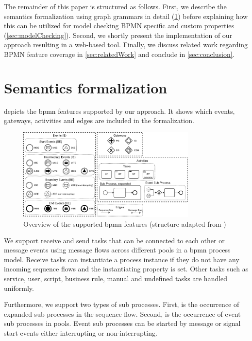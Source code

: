 \documentclass[adraft, copyright, creativecommons]{eptcs} %
\begin{document}
The remainder of this paper is structured as follows.
First, we describe the semantics formalization using graph grammars in detail (\cref{sec:formalization}) before explaining how this can be utilized for model checking BPMN specific and custom properties (\cref{sec:modelChecking}).
Second, we shortly present the implementation of our approach resulting in a web-based tool.
Finally, we discuss related work regarding BPMN feature coverage in \cref{sec:relatedWork} and conclude in \cref{sec:conclusion}.

\section{Semantics formalization} \label{sec:formalization}

 depicts the \gls*{bpmn} features supported by our approach.
It shows which events, gateways, activities and edges are included in the formalization.

\begin{figure}[h]
    \centering
    \includegraphics[width=0.8\textwidth]{images/bpmn_semantics-feature_overview.pdf}
    \caption{Overview of the supported \gls*{bpmn} features (structure adapted from \cite{houhouFirstOrderLogicVerification2022})}
    \label{fig:bpmnfeaturesOverview}
\end{figure}

We support receive and send tasks that can be connected to each other or message events using message flows across different pools in a \gls*{bpmn} process model.
Receive tasks can instantiate a process instance if they do not have any incoming sequence flows and the \textsf{instantiating} property is set.
Other tasks such as service, user, script, business rule, manual and undefined tasks are handled uniformly.

Furthermore, we support two types of sub processes.
First, is the occurrence of expanded sub processes in the sequence flow.
Second, is the occurrence of event sub processes in pools.
Event sub processes can be started by message or signal start events either interrupting or non-interrupting.
\end{document}
